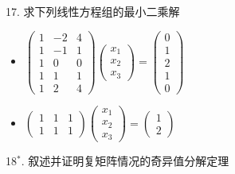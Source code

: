 
\begin{frame}

17. 求下列线性方程组的最小二乘解
\begin{itemize}
\item[(1)] $\begin{pmatrix} 1 & -2 & 4 \\ 1 & -1 & 1 \\ 1 & 0 & 0 \\ 1 & 1 & 1 \\ 1 & 2 & 4 \end{pmatrix} \begin{pmatrix} x_1 \\ x_2 \\ x_3 \end{pmatrix} = \begin{pmatrix} 0 \\ 1 \\ 2 \\ 1 \\ 0 \end{pmatrix}$
\item[(2)] $\begin{pmatrix} 1 & 1 & 1 \\ 1 & 1 & 1 \end{pmatrix} \begin{pmatrix} x_1 \\ x_2 \\ x_3 \end{pmatrix} = \begin{pmatrix} 1 \\ 2 \end{pmatrix}$
\end{itemize}

\vspace{1em}

18$^*$. 叙述并证明复矩阵情况的奇异值分解定理

\end{frame}




